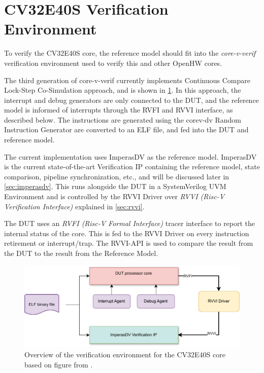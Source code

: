 \section{CV32E40S Verification Environment}
\label{sec:bg_core-v-verif}

To verify the CV32E40S core, the reference model should fit into the \textit{core-v-verif} verification environment used to verify this and other OpenHW cores\cite{openhwgroupOpenhwgroupCorevverif2023}.

The third generation of core-v-verif currently implements Continuous Compare Lock-Step Co-Simulation approach\cite{duncangrahamRISCVVerificationImplications2023}, and is shown in \cref{fig:cv32e40s-overview}. In this approach, the interrupt and debug generators are only connected to the DUT, and the reference model is informed of interrupts through the RVFI and RVVI interface, as described below. 
The instructions are generated using the corev-dv Random Instruction Generator are converted to an ELF file, and fed into the DUT and reference model\cite{openhwgroupOpenhwgroupCorevverif2023}.

The current implementation uses ImperasDV as the reference model. ImperasDV is the current state-of-the-art Verification IP containing the reference model, state comparison, pipeline synchronization, etc., and will be discussed later in \cref{sec:imperasdv}. This runs alongside the DUT in a SystemVerilog UVM Environment and is controlled by the RVVI Driver over \textit{RVVI (Risc-V Verification Interface)} \cite{taylorAdvancedRISCVVerification2023} explained in \cref{sec:rvvi}. 

The DUT uses an \textit{RVFI (Risc-V Formal Interface)} tracer interface to report the internal status of the core\cite{symbioticedaRiscvformalDocsRvfi2020}. This is fed to the RVVI Driver on every instruction retirement or interrupt/trap. The RVVI-API is used to compare the result from the DUT to the result from the Reference Model.


\begin{figure}[hbt]
    \centering
    \includegraphics[width=0.75\linewidth]{figures/core-v-verif.pdf}
    \caption{Overview of the verification environment for the CV32E40S core based on figure from \cite{openhwgroupOpenhwgroupCorevverif2023}.}
    \label{fig:cv32e40s-overview}
\end{figure}


